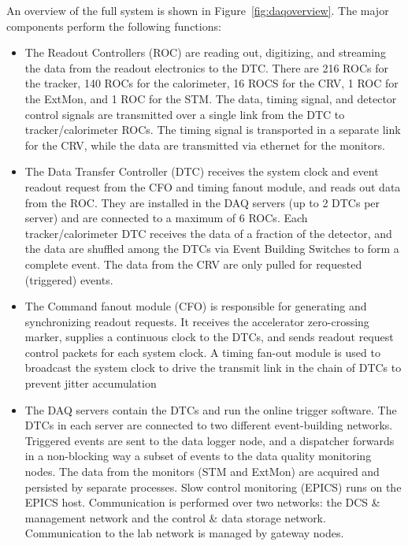 An overview of the full system is shown in Figure~\ref{fig:daqoverview}. The major components perform the following functions:
\begin{itemize} 
\item The Readout Controllers (ROC) are reading out, digitizing, and streaming the data from the readout electronics to the DTC. There are 216 ROCs for the tracker, 140 ROCs for the calorimeter, 16 ROCS for the CRV, 1 ROC for the ExtMon, and 1 ROC for the STM. The data, timing signal, and detector control signals are transmitted over a single link from the DTC to tracker/calorimeter ROCs. The timing signal is transported in a separate link for the CRV, while the data are transmitted via ethernet for the monitors. 

\item The Data Transfer Controller (DTC) receives the system clock and event readout request from the CFO and timing fanout module, and reads out data from the ROC. They are installed in the DAQ servers (up to 2 DTCs per server) and are connected to a maximum of 6 ROCs. Each tracker/calorimeter DTC receives the data of a fraction of the detector, and the data are shuffled among the DTCs via Event Building Switches to form a complete event. The data from the CRV are only pulled for requested (triggered) events. 

\item The Command fanout module (CFO) is responsible for generating and synchronizing readout requests. It receives the accelerator zero-crossing marker, supplies a continuous clock to the DTCs, and sends readout request control packets for each system clock. A timing fan-out module is used to broadcast the system clock to drive the transmit link in the chain of DTCs to prevent jitter accumulation

\item The DAQ servers contain the DTCs and run the online trigger software. The DTCs in each server are connected to two different event-building networks. Triggered events are sent to the data logger node, and a dispatcher forwards in a non-blocking way a subset of events to the data quality monitoring nodes. The data from the monitors (STM and ExtMon) are acquired and persisted by separate processes. Slow control monitoring (EPICS) runs on the EPICS host. Communication is performed over two networks: the DCS \& management network and the control \& data storage network. Communication to the lab network is managed by gateway nodes. 
\end{itemize} 

